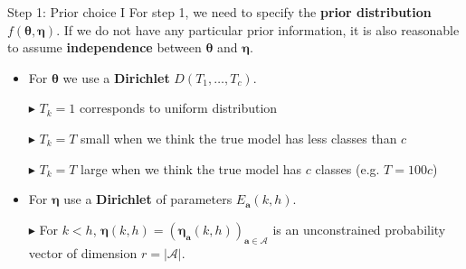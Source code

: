 \documentclass[aspectratio=169,xcolor=dvipsnames]{beamer}
\newcommand{\veca}{\boldsymbol{a}}
\newcommand{\seta}{\mathcal{A}}
\newcommand{\veceta}{\boldsymbol{\eta}}
\newcommand{\vectheta}{\boldsymbol{\theta}}
\begin{document}
\begin{frame}{Step 1: Prior choice I}
For step 1, we need to specify the \textbf{prior distribution} $f(\vectheta, \veceta)$. If we do not have any particular prior information, it is also reasonable to assume \textbf{independence} between $\vectheta$ and $\veceta$.
 
\vspace{5pt}
\begin{itemize}
    \item For $\vectheta$ we use a \textbf{Dirichlet} $D(T_1,\dots, T_c)$.
        \addtolength{\itemindent}{12pt}
        
        \item[$\blacktriangleright$] $T_k = 1$ corresponds to uniform distribution
        
        \item[$\blacktriangleright$]  $T_k =T$ small when we think the true model has less classes than $c$
        
        \item[$\blacktriangleright$]  $T_k=T$ large when we think the true model has $c$ classes (e.g. $T=100c$)
        \addtolength{\itemindent}{-12pt}
\vspace{10pt}
    
    \item For $\veceta$ use a \textbf{Dirichlet} of parameters $E_{\veca}(k,h)$.
        \addtolength{\itemindent}{12pt}
        
        \item[$\blacktriangleright$] For $k<h$, $\veceta(k,h)=(\veceta_{\veca}(k,h))_{\veca \in \seta}$ is an unconstrained probability vector of dimension $r=|\seta|$.
\end{itemize}
\end{frame}
\end{document}
